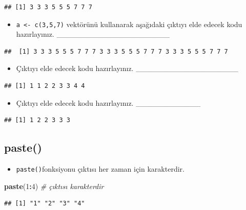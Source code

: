 \documentclass[
  oneside]{book}
\newenvironment{Shaded}{\begin{snugshade}}{\end{snugshade}}
\newcommand{\CommentTok}[1]{\textcolor[rgb]{0.56,0.35,0.01}{\textit{#1}}}
\newcommand{\DecValTok}[1]{\textcolor[rgb]{0.00,0.00,0.81}{#1}}
\newcommand{\FunctionTok}[1]{\textcolor[rgb]{0.13,0.29,0.53}{\textbf{#1}}}
\newcommand{\NormalTok}[1]{#1}
\newcommand{\SpecialCharTok}[1]{\textcolor[rgb]{0.81,0.36,0.00}{\textbf{#1}}}
\providecommand{\tightlist}{%
  \setlength{\itemsep}{0pt}\setlength{\parskip}{0pt}}
\begin{document}
\begin{verbatim}
## [1] 3 3 3 5 5 5 7 7 7
\end{verbatim}

\begin{itemize}
\tightlist
\item
  \texttt{a\ \textless{}-\ c(3,5,7)} vektörünü kullanarak aşağıdaki çıktıyı elde edecek kodu hazırlayınız. \_\_\_\_\_\_\_\_\_\_\_\_\_\_\_\_\_\_\_\_\_
\end{itemize}

\begin{verbatim}
##  [1] 3 3 3 5 5 5 7 7 7 3 3 3 5 5 5 7 7 7 3 3 3 5 5 5 7 7 7
\end{verbatim}

\begin{itemize}
\tightlist
\item
  Çıktıyı elde edecek kodu hazırlayınız. \_\_\_\_\_\_\_\_\_\_\_\_\_\_\_\_\_\_\_
\end{itemize}

\begin{verbatim}
## [1] 1 1 2 2 3 3 4 4
\end{verbatim}

\begin{itemize}
\tightlist
\item
  Çıktıyı elde edecek kodu hazırlayınız. \_\_\_\_\_\_\_\_\_\_\_\_
\end{itemize}

\begin{verbatim}
## [1] 1 2 2 3 3 3
\end{verbatim}

\hypertarget{paste}{%
\subsection{paste()}\label{paste}}

\begin{itemize}
\tightlist
\item
  \texttt{paste()}fonksiyonu çıktısı her zaman için karakterdir.
\end{itemize}

\begin{Shaded}
\begin{Highlighting}[]
\FunctionTok{paste}\NormalTok{(}\DecValTok{1}\SpecialCharTok{:}\DecValTok{4}\NormalTok{) }\CommentTok{\# çıktısı karakterdir}
\end{Highlighting}
\end{Shaded}

\begin{verbatim}
## [1] "1" "2" "3" "4"
\end{verbatim}
\end{document}
